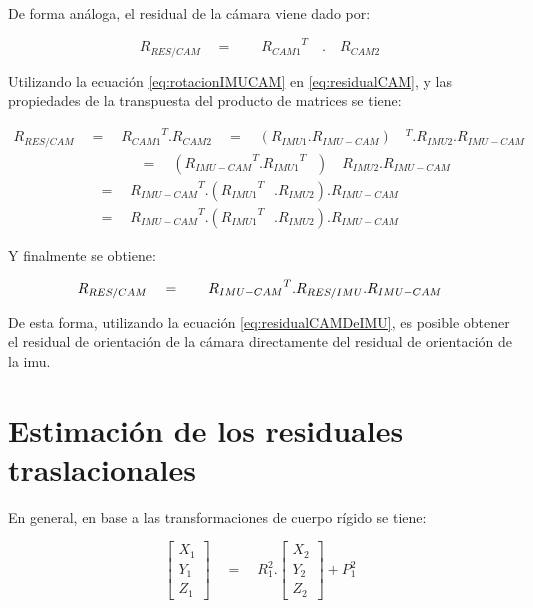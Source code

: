 De forma análoga, el residual de la cámara viene dado por:

\begin{equation}
{ R }_{ RES/CAM }\quad =\quad \quad { { R }_{ CAM1 } }^{ T }\quad .\quad { R }_{ CAM2 }
\label{eq:residualCAM} 
\end{equation}

Utilizando la ecuación \ref{eq:rotacionIMUCAM} en \ref{eq:residualCAM}, y las propiedades de la transpuesta del producto de matrices se tiene:

\begin{align}
{ R }_{ RES/CAM }\quad =\quad { { R }_{ CAM1 } }^{ T }.{ R }_{ CAM2 }\quad =\quad ({ R }_{ IMU1 }.{ R }_{ IMU-CAM })\quad ^{ T }.{ R }_{ IMU2 }.{ R }_{ IMU-CAM }\\ \quad \quad \quad \quad \quad \quad \quad \quad \quad =\quad ({ { R }_{ IMU-CAM } }^{ T }.{ { R }_{ IMU1 } }^{ T\quad  })\quad { R }_{ IMU2 }.{ R }_{ IMU-CAM }\\ \qquad \qquad \qquad ={ { \quad R }_{ IMU-CAM } }^{ T }.({ { R }_{ IMU1 } }^{ T\quad  }.{ R }_{ IMU2 }).{ R }_{ IMU-CAM }\\ \qquad \qquad \qquad =\quad { { R }_{ IMU-CAM } }^{ T }.({ { R }_{ IMU1 } }^{ T\quad  }.{ R }_{ IMU2 }).{ R }_{ IMU-CAM }
\label{eq:residualCAMProcedimiento} 
\end{align}

Y finalmente se obtiene:

\begin{equation}
{ R }_{ RES/CAM }\quad =\quad { { \quad R }_{ IMU-CAM } }^{ T }. { R }_{ RES/IMU } . { R }_{ IMU-CAM\\  }
\label{eq:residualCAMDeIMU} 
\end{equation}

De esta forma, utilizando la ecuación \ref{eq:residualCAMDeIMU}, es posible obtener el residual de orientación de la cámara directamente del residual de orientación de la imu.


\section{Estimación de los residuales traslacionales}


En general, en base a las transformaciones de cuerpo rígido se tiene:

\begin{equation}
\left[ \begin{matrix} { X }_{ 1 } \\ { Y }_{ 1 } \\ { Z }_{ 1 } \end{matrix} \right] \quad =\quad { R }_{ 1 }^{ 2 }.\left[ \begin{matrix} { X }_{ 2 } \\ { Y }_{ 2 } \\ { Z }_{ 2 } \end{matrix} \right] +{ P }_{ 1 }^{ 2 } 
\label{eq:TransformacionCAM1CAM2} 
\end{equation}


